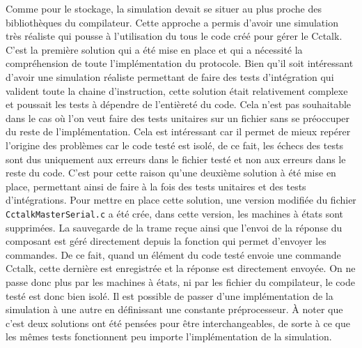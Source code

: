 \documentclass[a4paper]{article}
\begin{document}
Comme pour le stockage, la simulation devait se situer au plus proche des
bibliothèques du compilateur. Cette approche a permis d'avoir une simulation
très réaliste qui pousse à l'utilisation du tous le code créé pour gérer le
Cctalk. C'est la première solution qui a été mise en place et qui a nécessité la
compréhension de toute l'implémentation du protocole. Bien qu'il soit
intéressant d'avoir une simulation réaliste permettant de faire des tests
d'intégration qui valident toute la chaine d'instruction, cette solution était
relativement complexe et poussait les tests à dépendre de l'entièreté du code.
Cela n'est pas souhaitable dans le cas où l'on veut faire des tests unitaires
sur un fichier sans se préoccuper du reste de l'implémentation. Cela est
intéressant car il permet de mieux repérer l'origine des problèmes car le code
testé est isolé, de ce fait, les échecs des tests sont dus uniquement aux
erreurs dans le fichier testé et non aux erreurs dans le reste du code. C'est
pour cette raison qu'une deuxième solution à été mise en place, permettant ainsi
de faire à la fois des tests unitaires et des tests d'intégrations. Pour mettre
en place cette solution, une version modifiée du fichier
\verb|CctalkMasterSerial.c| a été crée, dans cette version, les machines à états
sont supprimées. La sauvegarde de la trame reçue ainsi que l'envoi de la réponse
du composant est géré directement depuis la fonction qui permet d'envoyer les
commandes. De ce fait, quand un élément du code testé envoie une commande
Cctalk, cette dernière est enregistrée et la réponse est directement envoyée. On
ne passe donc plus par les machines à états, ni par les fichier du compilateur,
le code testé est donc bien isolé. Il est possible de passer d'une
implémentation de la simulation à une autre en définissant une constante
préprocesseur. À noter que c'est deux solutions ont été pensées pour être
interchangeables, de sorte à ce que les mêmes tests fonctionnent peu importe
l'implémentation de la simulation.
\end{document}
